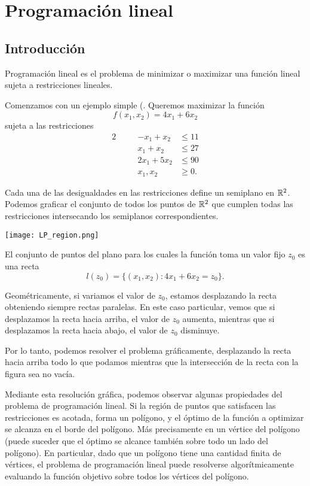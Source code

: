\chapter{Programaci\'on lineal}

\section{Introducci\'on}

Programaci\'on lineal es el problema de minimizar o maximizar una funci\'on lineal sujeta a restricciones lineales.

Comenzamos con un ejemplo simple (\cite[Capítulo 9.3]{Cengage}. Queremos maximizar la función
$$f(x_1, x_2) = 4x_1 + 6x_2$$
sujeta a las restricciones
\begin{alignat*}{2}
   & \quad & -x_1 + x_2 &\le 11 \\
   &   \quad & x_1 + x_2 &\le 27 \\
   &   \quad & 2x_1 + 5x_2 &\le 90 \\
   & &  x_1, x_2 &\ge 0.
\end{alignat*}

Cada una de las desigualdades en las restricciones define un semiplano en $\mathbb{R}^2$.
Podemos graficar el conjunto de todos los puntos de $\mathbb{R}^2$ que cumplen todas las restricciones intersecando los semiplanos correspondientes.

\begin{center}
\texttt{[image: LP\_region.png]}
\end{center}

El conjunto de puntos del plano para los cuales la función toma un valor fijo $z_0$ es una recta
$$
l(z_0) = \{(x_1, x_2) : 4x_1 + 6x_2 = z_0\}.
$$

Geométricamente, si variamos el valor de $z_0$, estamos desplazando la recta obteniendo siempre rectas paralelas. En este caso particular, vemos que si desplazamos la recta hacia arriba, el valor de $z_0$ aumenta, mientras que si desplazamos la recta hacia abajo, el valor de $z_0$ disminuye.

Por lo tanto, podemos resolver el problema gráficamente, desplazando la recta hacia arriba todo lo que podamos mientras que la intersección de la recta con la figura sea no vacía.

Mediante esta resolución gráfica, podemos observar algunas propiedades del problema de programación lineal. Si la región de puntos que satisfacen las restricciones es acotada, forma un polígono, y el óptimo de la función a optimizar se alcanza en el borde del polígono. Más precisamente en un vértice del polígono (puede suceder que el óptimo se alcance también sobre todo un lado del polígono). En particular, dado que un polígono tiene una cantidad finita de vértices, el problema de programación lineal puede resolverse algorítmicamente evaluando la función objetivo sobre todos los vértices del polígono.


